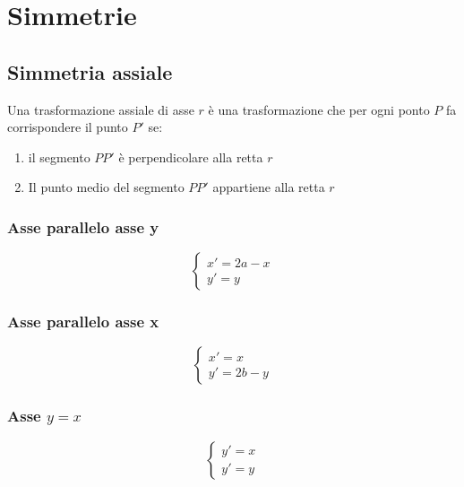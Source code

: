 \chapter{Simmetrie}
\section{Simmetria assiale}
Una trasformazione assiale di asse $r$ è una trasformazione che per ogni ponto $P$ fa corrispondere il punto $P'$ se:
\begin{enumerate}
	\item il segmento $PP'$ è perpendicolare alla retta $r$
	\item Il punto medio del segmento $PP'$ appartiene alla retta $r$
\end{enumerate}
\subsection{Asse parallelo asse y}
\begin{tcolorbox}[sidebyside,righthand width=7cm,colback=white,colframe=white,fonttitle=\bfseries	]
\[\begin{cases}
x'=2a-x\\
y'=y
\end{cases}
\]
\tcblower
	
\end{tcolorbox}
\subsection{Asse parallelo asse x}
\begin{tcolorbox}[sidebyside,righthand width=7cm,colback=white,colframe=white,fonttitle=\bfseries	]
		\[\begin{cases}
	x'=x\\
	y'=2b-y
	\end{cases}
	\]
	\tcblower
	
\end{tcolorbox}
\subsection{Asse $y=x$}
\begin{tcolorbox}[sidebyside,righthand width=7cm,colback=white,colframe=white,fonttitle=\bfseries	]
	\[\begin{cases}
	y'=x\\
	y'=y
	\end{cases}
	\]
\tcblower
		
\end{tcolorbox}
